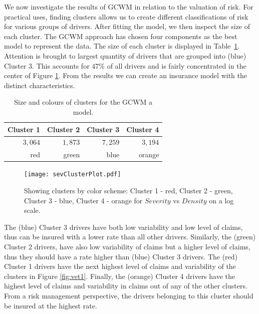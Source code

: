 \documentclass[12pt,letterpaper]{article}
\numberwithin{equation}{section}
\numberwithin{equation}{section}
\numberwithin{equation}{section}
\begin{document}
	We now investigate the results of GCWM in relation to the valuation of risk. For practical uses, finding clusters allows us to create different classifications of risk for various groups of drivers.
%
After fitting the model, we then inspect the size of each cluster. The GCWM approach has chosen four components as the best model to represent the data. The size of each cluster is displayed in Table~\ref{table:sizeSev}. Attention is brought to largest quantity of drivers that are grouped into (blue) Cluster 3. This accounts for $ 47 \% $ of all drivers and is fairly concentrated in the center of Figure \ref{fig:vet1a}. From the results we can create an insurance model with the distinct characteristics.
\begin{table}[!htb]
\centering
\caption{Size and colours of clusters for the GCWM a model.}
\label{table:sizeSev}
\begin{tabular}{rrrr}
\hline
Cluster 1   & Cluster 2  & Cluster 3   & Cluster 4    \\
\hline
$3,064$ & $1,873$  &$ 7,259$ & $3,194$ \\
red & green & blue & orange \\
\hline
\end{tabular}
\end{table}
\begin{figure}[!htb]
\begin{center}
\texttt{[image: sevClusterPlot.pdf]}
\end{center}
\vspace{-0.2in}
\caption{Showing clusters by color scheme: Cluster 1 - red, Cluster 2 - green, Cluster 3 - blue, Cluster 4 - orange for $Severity$ vs $Density$ on a log scale. }
\label{fig:vet1a}
\end{figure}


The (blue) Cluster 3 drivers have both low variability and low level of claims, thus can be insured with a lower rate than all other drivers. Similarly, the (green) Cluster 2 drivers, have also low variability of claims but a higher level of claims, thus they should have a rate higher than (blue) Cluster 3  drivers. The (red) Cluster 1 drivers have the next highest level of claims and variability of the clusters in Figure \ref{fig:vet1}. Finally, the (orange) Cluster 4  drivers have the highest level of claims and variability in claims out of any of the other clusters. From a risk management perspective, the drivers belonging to  this cluster should be insured at the highest rate.
\end{document}
